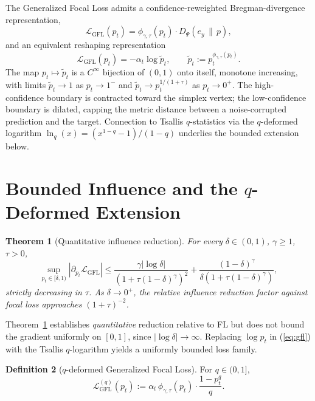 \documentclass[conference]{IEEEtran}
\newtheorem{theorem}{Theorem}
\theoremstyle{definition}
\newtheorem{definition}[theorem]{Definition}
\newcommand{\LGFL}{\mathcal{L}_{\mathrm{GFL}}}
\newcommand{\LGFLq}{\mathcal{L}_{\mathrm{GFL}}^{(q)}}
\newcommand{\BD}{D_{\Psi}}
\begin{document}
The Generalized Focal Loss admits a confidence-reweighted Bregman-divergence representation,
\begin{equation}
\LGFL(p_t) = \phi_{\gamma,\tau}(p_t) \cdot \BD(e_y \,\|\, p),
\end{equation}
and an equivalent reshaping representation
\begin{equation}
\LGFL(p_t) = -\alpha_t \log \tilde p_t, \qquad \tilde p_t := p_t^{\phi_{\gamma,\tau}(p_t)}.
\label{eq:reshape}
\end{equation}
The map $p_t \mapsto \tilde p_t$ is a $C^\infty$ bijection of $(0,1)$ onto itself, monotone increasing, with limits $\tilde p_t \to 1$ as $p_t \to 1^-$ and $\tilde p_t \to p_t^{1/(1+\tau)}$ as $p_t \to 0^+$. The high-confidence boundary is contracted toward the simplex vertex; the low-confidence boundary is dilated, capping the metric distance between a noise-corrupted prediction and the target. Connection to Tsallis $q$-statistics \cite{tsallis1988possible} via the $q$-deformed logarithm $\ln_q(x) = (x^{1-q}-1)/(1-q)$ underlies the bounded extension below.

\section{Bounded Influence and the $q$-Deformed Extension}
\label{sec:robustness}

\begin{theorem}[Quantitative influence reduction]\label{thm:if-gfl}
For every $\delta \in (0,1)$, $\gamma \ge 1$, $\tau > 0$,
\begin{equation}
\sup_{p_t \in [\delta, 1)} |\partial_{p_t}\LGFL| \le \frac{\gamma|\log\delta|}{(1+\tau(1-\delta)^\gamma)^2} + \frac{(1-\delta)^\gamma}{\delta(1+\tau(1-\delta)^\gamma)},
\label{eq:if-gfl}
\end{equation}
strictly decreasing in $\tau$. As $\delta \to 0^+$, the relative influence reduction factor against focal loss approaches $(1+\tau)^{-2}$.
\end{theorem}

Theorem~\ref{thm:if-gfl} establishes \emph{quantitative} reduction relative to FL but does not bound the gradient uniformly on $[0,1]$, since $|\log\delta| \to \infty$. Replacing $\log p_t$ in (\ref{eq:gfl}) with the Tsallis $q$-logarithm yields a uniformly bounded loss family.

\begin{definition}[$q$-deformed Generalized Focal Loss]\label{def:gfl-q}
For $q \in (0, 1]$,
\begin{equation}
\LGFLq(p_t) := \alpha_t\,\phi_{\gamma,\tau}(p_t) \cdot \frac{1 - p_t^q}{q}.
\label{eq:gfl-q}
\end{equation}
\end{definition}
\end{document}
